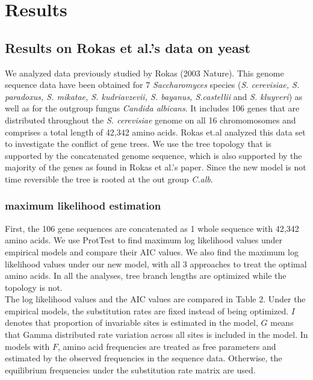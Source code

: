 \documentclass[13pt]{article}
\begin{document}
\section{Results}


\subsection{Results on Rokas et al.'s data on yeast}
We analyzed data previously studied by Rokas (2003 Nature).
This genome sequence data have been obtained for 7 {\it Saccharomyces} species ({\it S. cerevisiae, S. paradoxus, S. mikatae, S. kudriavzevii, S. bayanus, S.castellii} and {\it S. kluyveri}) as well as for the outgroup fungus {\it Candida albicans}.
It includes 106 genes that are distributed throughout the {\it S. cerevisiae} genome on all 16 chromomosomes and comprises a total length of 42,342 amino acids.
Rokas et.al analyzed this data set to investigate the conflict of gene trees.
We use the tree topology that is supported by the concatenated genome sequence, which is also supported by the majority of the genes as found in Rokas et al.'s paper.
Since the new model is not time reversible the tree is rooted at the out group {\it C.alb}.\\

\subsubsection{maximum likelihood estimation}
First, the 106 gene sequences are concatenated as 1 whole sequence with 42,342 amino acids.
We use ProtTest to find maximum log likelihood values under empirical models and compare their AIC values.
We also find the maximum log likelihood values under our new model, with all 3 approaches to treat the optimal amino acids.
In all the analyses, tree branch lengths are optimized while the topology is not. \\

The log likelihood values and the AIC values are compared in Table 2.
Under the empirical models, the substitution rates are fixed instead of being optimized. 
$I$ denotes that proportion of invariable sites is estimated in the model, $G$ means that Gamma distributed rate variation across all sites is included in the model.
In models with $F$, amino acid frequencies are treated as free parameters and estimated by the observed frequencies in the sequence data.
Otherwise, the equilibrium frequencies under the substitution rate matrix are used.\\
\end{document}

